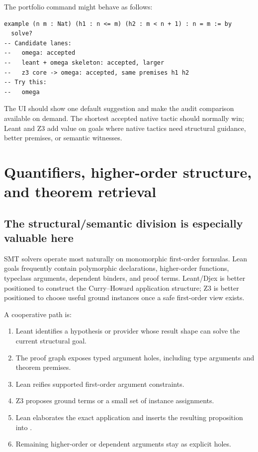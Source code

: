 \documentclass[11pt,letterpaper,openany]{report}
\newcommand{\code}[1]{\texttt{\detokenize{#1}}}
\begin{document}
The portfolio command might behave as follows:

\begin{lstlisting}[language=LeanFour,caption={Illustrative portfolio command}]
example (n m : Nat) (h1 : n <= m) (h2 : m < n + 1) : n = m := by
  solve?
-- Candidate lanes:
--   omega: accepted
--   leant + omega skeleton: accepted, larger
--   z3 core -> omega: accepted, same premises h1 h2
-- Try this:
--   omega
\end{lstlisting}

The UI should show one default suggestion and make the audit comparison available on
demand. The shortest accepted native tactic should normally win; Leant and Z3 add
value on goals where native tactics need structural guidance, better premises, or
semantic witnesses.

\chapter{Quantifiers, higher-order structure, and theorem retrieval}
\label{ch:quantifiers}

\section{The structural/semantic division is especially valuable here}

SMT solvers operate most naturally on monomorphic first-order formulas. Lean goals
frequently contain polymorphic declarations, higher-order functions, typeclass
arguments, dependent binders, and proof terms. Leant/Djex is better positioned to
construct the Curry--Howard application structure; Z3 is better positioned to choose
useful ground instances once a safe first-order view exists.

A cooperative path is:

\begin{enumerate}
  \item Leant identifies a hypothesis or provider whose result shape can solve the
        current structural goal.
  \item The proof graph exposes typed argument holes, including type arguments and
        theorem premises.
  \item Lean reifies supported first-order argument constraints.
  \item Z3 proposes ground terms or a small set of instance assignments.
  \item Lean elaborates the exact application and inserts the resulting proposition
        into \code{grind}.
  \item Remaining higher-order or dependent arguments stay as explicit holes.
\end{enumerate}
\end{document}
